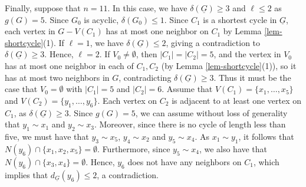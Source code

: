 \documentclass[12pt,oneside]{amsart}
\begin{document}
Finally, suppose that $n=11$. In this case, we have $\delta(\underline{G})\geq 3$ and  $\ell\leq 2$ as $g(G) =5$. Since $G_0$ is acyclic, $\delta(G_0) \le 1$. Since $C_1$ is a shortest cycle in $\underline{G}$, each vertex in $G-V(C_1)$ has at most one neighbor on $C_1$ by Lemma \ref{lem-shortcycle}(1). If $\ell =1$, we have $\delta(\underline{G}) \le 2$, giving a contradiction to $\delta(\underline{G})\geq 3$. Hence,  $\ell=2$. If $V_0\neq \emptyset$, then $|C_1|=|C_2|=5$, and the vertex in $V_0$ has at most one neighbor in each of $C_1, C_2$ (by Lemma \ref{lem-shortcycle}(1)), so it has at most two neighbors in $G$, contradicting $\delta(\underline{G})\geq 3$. Thus it must be the case that $V_0=\emptyset$ with $|C_1|=5$ and $|C_2|=6$. Assume that $V(C_1)=\{x_1,\dots,x_5\}$ and $V(C_2)=\{y_1,\dots,y_6\}$. Each vertex on $C_2$ is adjacent to at least one vertex on $C_1$, as $\delta(\underline{G})\geq 3$.
Since $g(G)=5$, we can assume without loss of generality that $y_1\sim x_1$ and $y_2\sim x_3$. Moreover, since there is no cycle of length less than five, we must have that $y_3\sim x_5$, $y_4\sim x_2$ and $y_5\sim x_4$. As $x_1\sim y_1$, it follows that $N(y_6)\cap \{x_1, x_2, x_5\} = \emptyset$.
Furthermore, since $y_5\sim x_4$, we also have that $N(y_6)\cap \{x_3, x_4\} = \emptyset$.
Hence, $y_6$ does not have any neighbors on $C_1$, which implies that $d_{\underline{G}}(y_6) \le 2$, a contradiction.









\end{document}
